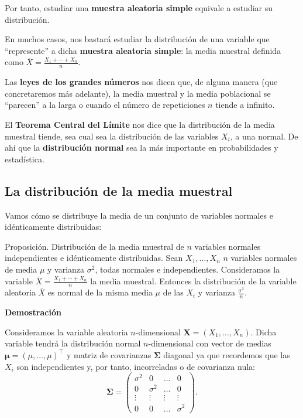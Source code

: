\documentclass[]{book}
\begin{document}
Por tanto, estudiar una \textbf{muestra aleatoria simple} equivale a estudiar su distribución.

En muchos casos, nos bastará estudiar la distribución de una variable que ``represente'' a dicha \textbf{muestra aleatoria simple}: la media muestral definida como \(\overline{X}=\frac{X_1+\cdots + X_n}{n}\).

Las \textbf{leyes de los grandes números} nos dicen que, de alguna manera (que concretaremos más adelante), la media muestral y la media poblacional se ``parecen'' a la larga o cuando el número de repeticiones \(n\) tiende a infinito.

El \textbf{Teorema Central del Límite} nos dice que la distribución de la media muestral tiende, sea cual sea la distribución de las variables \(X_i\), a una normal. De ahí que la \textbf{distribución normal} sea la más importante en probabilidades y estadística.

\hypertarget{la-distribuciuxf3n-de-la-media-muestral}{%
\subsection{La distribución de la media muestral}\label{la-distribuciuxf3n-de-la-media-muestral}}

Vamos cómo se distribuye la media de un conjunto de variables normales e idénticamente distribuidas:

Proposición. Distribución de la media muestral de \(n\) variables normales independientes e idénticamente distribuidas.
Sean \(X_1,\ldots, X_n\) \(n\) variables normales de media \(\mu\) y varianza \(\sigma^2\), todas normales e independientes. Consideramos la variable \(\overline{X}=\frac{X_1+\cdots + X_n}{n}\) la media muestral. Entonces la distribución de la variable aleatoria \(\overline{X}\) es normal de la misma media \(\mu\) de las \(X_i\) y varianza \(\frac{\sigma^2}{n}\).

\textbf{Demostración}

Consideramos la variable aleatoria \(n\)-dimensional \(\mathbf{X}=(X_1,\ldots,X_n)\). Dicha variable tendrá la distribución normal \(n\)-dimensional con vector de medias \(\mathbf{\mu}=(\mu,\ldots,\mu)^\top\) y matriz de covarianzas \(\mathbf{\Sigma}\) diagonal ya que recordemos que las \(X_i\) son independientes y, por tanto, incorreladas o de covarianza nula:
\[
\mathbf{\Sigma}=\begin{pmatrix}
\sigma^2 & 0 & \ldots & 0 \\
0 & \sigma^2 & \ldots & 0 \\
\vdots & \vdots & \vdots & \vdots \\
0 & 0 & \ldots & \sigma^2
\end{pmatrix}.
\]
\end{document}
